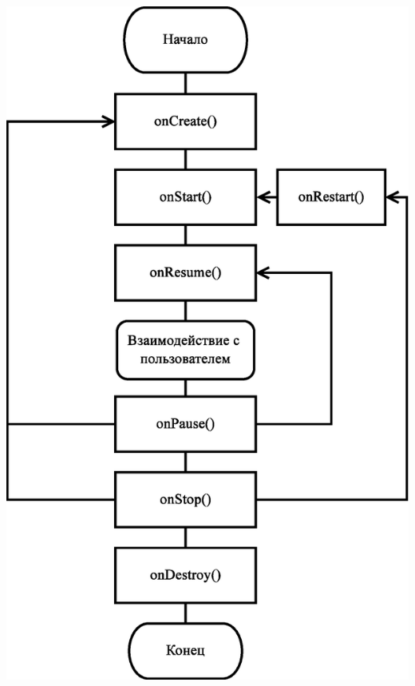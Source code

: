 \documentclass[russian,utf8,a1paper,nostitching,simple]{eskdgraph}
\begin{document}
\begin{ESKDdrawing}
\begin{minipage}{47cm}
  \end{minipage}
  \hspace{2cm}
  \begin{minipage}{30cm}
    \centering
     \\
    \vspace{2cm}
    \centering
    \includegraphics[height=48cm]{fig/implementation_ui_lifecycle_activity.eps}
  \end{minipage}
\end{ESKDdrawing}

\setcounter{page}{1}
\begin{ESKDdrawing}
\end{ESKDdrawing}
\end{document}
